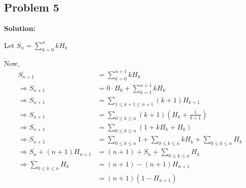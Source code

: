 \subsection{Problem 5}
\textbf{}
\par

\begin{flushleft}
\textbf{Solution: }
\par
Let $ S_n = \sum_{k=0}^{n} kH_k $
\par
Now,
$$
\begin{aligned}
    S_{n+1} &= \sum_{k=0}^{n+1} kH_k \\
    \Rightarrow S_{n+1} &= 0 \cdot H_0 + \sum_{k=1}^{n+1} kH_k \\
    \Rightarrow S_{n+1} &= \sum_{1 \leq k+1 \leq n+1}^{} (k+1)H_{k+1} \\
    \Rightarrow S_{n+1} &= \sum_{0 \leq k \leq n} (k+1)(H_k + \frac{1}{k+1}) \\
    \Rightarrow S_{n+1} &= \sum_{0 \leq k \leq n} (1 + kH_k + H_k) \\
    \Rightarrow S_{n+1} &= \sum_{0 \leq k \leq n} 1 + \sum_{0 \leq k \leq n} kH_k + \sum_{0 \leq k \leq n} H_k \\
    \Rightarrow S_n + (n+1)H_{n+1} &= (n+1) + S_n + \sum_{0 \leq k \leq n} H_k \\
    \Rightarrow \sum_{0 \leq k \leq n} H_k &= (n+1) - (n+1)H_{n+1} \\
    & = (n+1)(1-H_{n+1})  
\end{aligned}
$$
\end{flushleft}